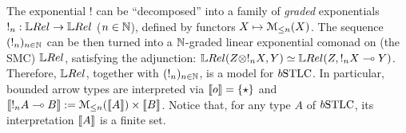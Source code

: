 \begin{remark}\label{rmk:ModelsOfBSTLC}
The exponential $!$ can be ``decomposed'' into a family of \emph{graded} exponentials $!_n:\LREL\to\LREL$ ($n\in\mathbb{N}$), defined by functors $X\mapsto \mathcal{M}_{\leq n}(X)$. %
The sequence $(!_n)_{n\in\mathbb{N}}$ can be then turned into a $\mathbb{N}$-graded linear exponential comonad on (the SMC) $\LREL$, satisfying the adjunction:
$\LREL(Z\otimes !_{n}X,Y) \simeq \LREL(Z, !_{n}X\multimap Y)$.
Therefore, $\LREL$, together with $(!_n)_{n\in\mathbb{N}}$, is a model for $\BSTLC$. 
In particular, bounded arrow types are interpreted via
$\llbracket o\rrbracket=\{\star\}$ and 
$\llbracket!_{n}A\multimap B\rrbracket:= \mathcal{M}_{\leq n}(\llbracket A\rrbracket) \times \llbracket B\rrbracket$.
Notice that, for any type $A$ of $\BSTLC$, its interpretation $\llbracket A\rrbracket$ is a finite set.
\end{remark}



